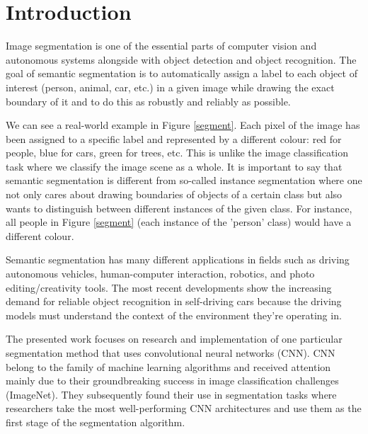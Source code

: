 \chapter{Introduction}
Image segmentation is one of the essential parts of computer vision and autonomous systems alongside with object detection and object recognition. The goal of semantic segmentation is to automatically assign a label to each object of interest (person, animal, car, etc.) in a given image while drawing the exact boundary of it and to do this as robustly and reliably as possible. 

We can see a real-world example in Figure \ref{segment}. Each pixel of the image has been assigned to a specific label and represented by a different colour: red for people, blue for cars, green for trees, etc. This is unlike the image classification task where we classify the image scene as a whole. It is important to say that semantic segmentation is different from so-called instance segmentation where one not only cares about drawing boundaries of objects of a certain class but also wants to distinguish between different instances of the given class. For instance, all people in Figure \ref{segment} (each instance of the 'person' class) would have a different colour.

Semantic segmentation has many different applications in fields such as driving autonomous vehicles, human-computer interaction, robotics, and photo editing/creativity tools. The most recent developments show the increasing demand for reliable object recognition in self-driving cars because the driving models must understand the context of the environment they’re operating in. \cite{mwiti}

The presented work focuses on research and implementation of one particular segmentation method that uses convolutional neural networks (CNN). CNN belong to the family of machine learning algorithms and received attention mainly due to their groundbreaking success in image classification challenges (ImageNet). They subsequently found their use in segmentation tasks where researchers take the most well-performing CNN architectures and use them as the first stage of the segmentation algorithm.

